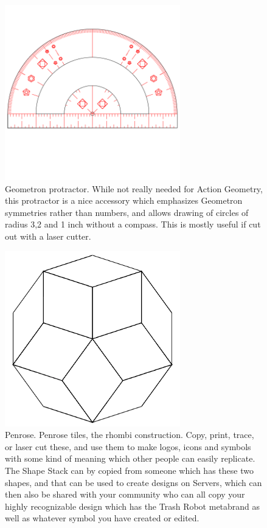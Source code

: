 \begin{figure}
	\centering
	\includegraphics[width=3in]{figures/actiongeometry/protractor.png}
	\caption[protractor]
	{Geometron protractor.  While not really needed for Action Geometry, this protractor is a nice accessory which emphasizes Geometron symmetries rather than numbers, and allows drawing of circles of radius 3,2 and 1 inch without a compass.  This is mostly useful if cut out with a laser cutter.}
\end{figure}


\begin{figure}
	\centering
	\includegraphics[width=3in]{figures/actiongeometry/penrose.png}
	\caption[penrose]
	{Penrose. Penrose tiles, the rhombi construction.  Copy, print, trace, or laser cut these, and use them to make logos, icons and symbols with some kind of meaning which other people can easily replicate.  The Shape Stack can by copied from someone which has these two shapes, and that can be used to create designs on Servers, which can then also be shared with your community who can all copy your highly recognizable design which has the Trash Robot metabrand as well as whatever symbol you have created or edited.}
\end{figure}

